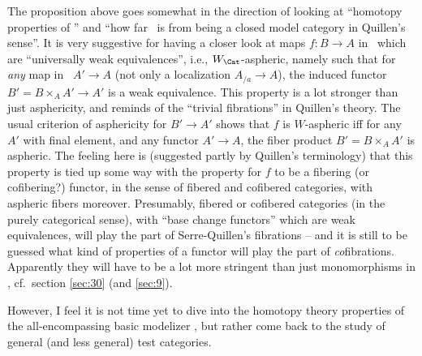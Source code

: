 The proposition above goes somewhat in the direction of looking at
``homotopy properties of \Cat'' and ``how far \Cat\ is from being a
closed model category in Quillen's sense''. It is very suggestive
for having a closer look at maps $f: B \to A$ in
\Cat\ which are ``universally weak equivalences'', i.e.,
$W_\Cat$-aspheric, namely such that for \emph{any} map in \Cat\ $A'\to
A$ (not only a localization $A_{/a}\to A$), the induced functor
$B'=B\times_A A' \to A'$ is a weak equivalence. This property is a lot
stronger than just asphericity, and reminds of the ``trivial
fibrations'' in Quillen's theory. The usual criterion of asphericity
for $B'\to A'$ shows that $f$ is $W$-aspheric if{f} for any $A'$ with
final element, and any functor $A'\to A$, the fiber product
$B'=B\times_A A'$ is aspheric. The feeling here is (suggested partly
by Quillen's terminology) that this property is tied up some way with
the property for $f$ to be a fibering (or cofibering?) functor, in the
sense of fibered and cofibered categories, with aspheric fibers
moreover. Presumably, fibered or cofibered categories (in the purely categorical sense), with ``base
change functors'' which are weak equivalences, will play the part of
Serre-Quillen's fibrations -- and it is still to be guessed what kind
of properties of a functor will play the part of
\emph{co}fibrations. Apparently they will have to be a lot more
stringent than just monomorphisms in \Cat, cf.\ section \ref{sec:30} (and \ref{sec:9}).

However, I feel it is not time yet to dive into the homotopy theory
properties of the all-encompassing basic modelizer \Cat, but rather
come back to the study of general (and less general) test categories.

